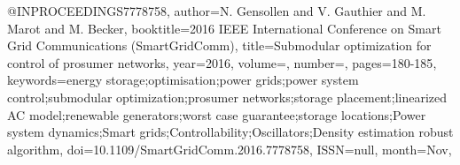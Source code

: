 @INPROCEEDINGS{7778758, 
author={N. {Gensollen} and V. {Gauthier} and M. {Marot} and M. {Becker}}, 
booktitle={2016 IEEE International Conference on Smart Grid Communications (SmartGridComm)}, 
title={Submodular optimization for control of prosumer networks}, 
year={2016}, 
volume={}, 
number={}, 
pages={180-185}, 
keywords={energy storage;optimisation;power grids;power system control;submodular optimization;prosumer networks;storage placement;linearized AC model;renewable generators;worst case guarantee;storage locations;Power system dynamics;Smart grids;Controllability;Oscillators;Density estimation robust algorithm}, 
doi={10.1109/SmartGridComm.2016.7778758}, 
ISSN={null}, 
month={Nov},}
